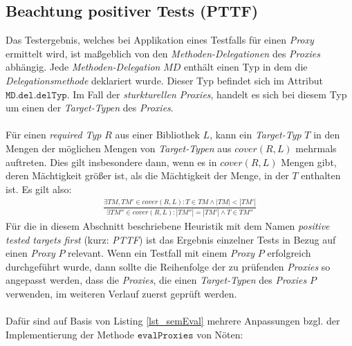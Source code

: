 \subsection{Beachtung positiver Tests (PTTF)}\label{sec_pttf}
Das Testergebnis, welches bei Applikation eines Testfalls für einen \emph{Proxy} ermittelt wird, ist maßgeblich von den \emph{Methoden-Delegationen} des \emph{Proxies} abhängig. Jede \emph{Methoden-Delegation} $\mathit{MD}$ enthält einen Typ in dem die \emph{Delegationsmethode} deklariert wurde. Dieser Typ befindet sich im Attribut $\texttt{MD.del.delTyp}$. Im Fall der \emph{sturkturellen Proxies}, handelt es sich bei diesem Typ um einen der \emph{Target-Typen} des \emph{Proxies}.
\\\\
Für einen \emph{required Typ} $R$ aus einer Bibliothek $L$, kann ein \emph{Target-Typ} $T$ in den Mengen der möglichen Mengen von \emph{Target-Typen} aus $\mathit{cover(R,L)}$ mehrmals auftreten. Dies gilt insbesondere dann, wenn es in $\mathit{cover(R,L)}$ Mengen gibt, deren Mächtigkeit größer ist, als die Mächtigkeit der Menge, in der $T$ enthalten ist. Es gilt also:
\begin{gather*}
\frac{\exists \mathit{TM},\mathit{TM'} \in \mathit{cover(R,L)} :  T \in \mathit{TM} \wedge |\mathit{TM}| < |\mathit{TM'}|}{\exists \mathit{TM''} \in \mathit{cover(R,L)} : |\mathit{TM''}| = |\mathit{TM'}| \wedge T \in \mathit{TM''}}
\end{gather*}
\noindent
Für die in diesem Abschnitt beschriebene \Gls{Heuristik} mit dem Namen \emph{positive tested targets first} (kurz: \emph{PTTF}) ist das Ergebnis einzelner Tests in Bezug auf einen \emph{Proxy} $P$ relevant. Wenn ein Testfall mit einem \emph{Proxy} $P$ erfolgreich durchgeführt wurde, dann sollte die Reihenfolge der zu prüfenden \emph{Proxies} so angepasst werden, dass die \emph{Proxies}, die einen \emph{Target-Typen} des \emph{Proxies} $P$ verwenden, im weiteren Verlauf zuerst geprüft werden.
\\\\
Dafür sind auf Basis von Listing \ref{lst_semEval} mehrere Anpassungen bzgl. der Implementierung der Methode $\texttt{evalProxies}$ von Nöten:
